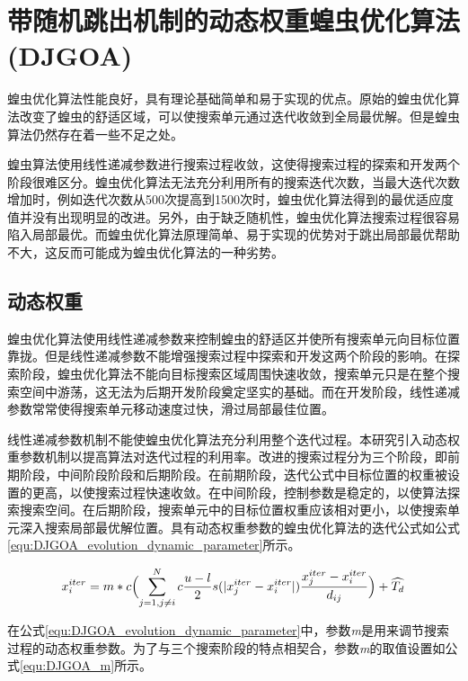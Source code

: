 \section{带随机跳出机制的动态权重蝗虫优化算法(DJGOA)}
\label{sec:task_scheduling_DJGOA}

蝗虫优化算法性能良好，具有理论基础简单和易于实现的优点。原始的蝗虫优化算法改变了蝗虫的舒适区域，可以使搜索单元通过迭代收敛到全局最优解。但是蝗虫算法仍然存在着一些不足之处。

蝗虫算法使用线性递减参数进行搜索过程收敛，这使得搜索过程的探索和开发两个阶段很难区分。蝗虫优化算法无法充分利用所有的搜索迭代次数，当最大迭代次数增加时，例如迭代次数从500次提高到1500次时，蝗虫优化算法得到的最优适应度值并没有出现明显的改进。另外，由于缺乏随机性，蝗虫优化算法搜索过程很容易陷入局部最优。而蝗虫优化算法原理简单、易于实现的优势对于跳出局部最优帮助不大，这反而可能成为蝗虫优化算法的一种劣势。

\subsection{动态权重}

蝗虫优化算法使用线性递减参数来控制蝗虫的舒适区并使所有搜索单元向目标位置靠拢。但是线性递减参数不能增强搜索过程中探索和开发这两个阶段的影响。在探索阶段，蝗虫优化算法不能向目标搜索区域周围快速收敛，搜索单元只是在整个搜索空间中游荡，这无法为后期开发阶段奠定坚实的基础。而在开发阶段，线性递减参数常常使得搜索单元移动速度过快，滑过局部最佳位置。

线性递减参数机制不能使蝗虫优化算法充分利用整个迭代过程。本研究引入动态权重参数机制以提高算法对迭代过程的利用率。改进的搜索过程分为三个阶段，即前期阶段，中间阶段阶段和后期阶段。在前期阶段，迭代公式中目标位置的权重被设置的更高，以使搜索过程快速收敛。在中间阶段，控制参数是稳定的，以使算法探索搜索空间。在后期阶段，搜索单元中的目标位置权重应该相对更小，以使搜索单元深入搜索局部最优解位置。具有动态权重参数的蝗虫优化算法的迭代公式如公式\ref{equ:DJGOA_evolution_dynamic_parameter}所示。

\begin{equation}\label{equ:DJGOA_evolution_dynamic_parameter}
    x^{iter}_i = m*c \Bigl(\sum_{j=1,j\neq{i}}^N c \frac{u-l}{2}s (\lvert x^{iter}_j-x^{iter}_i \rvert )\frac{x^{iter}_j-x^{iter}_i}{d_{ij}} \Bigr) + \widehat{T_d}
\end{equation}

在公式\ref{equ:DJGOA_evolution_dynamic_parameter}中，参数\emph{m}是用来调节搜索过程的动态权重参数。为了与三个搜索阶段的特点相契合，参数\emph{m}的取值设置如公式\ref{equ:DJGOA_m}所示。

